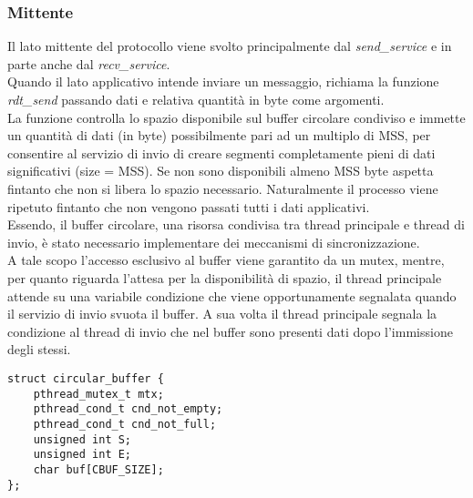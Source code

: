 \subsubsection{Mittente}
%
Il lato mittente del protocollo viene svolto principalmente dal 
\emph{send\_service} e in parte anche dal \emph{recv\_service}.\\
Quando il lato applicativo intende inviare un messaggio, richiama la funzione
\emph{rdt\_send} passando dati e relativa quantità in byte come argomenti.\\
La funzione controlla lo spazio disponibile sul buffer circolare condiviso
e immette un quantità di dati (in byte) possibilmente pari ad un multiplo di 
MSS, per consentire al servizio di invio di creare segmenti completamente pieni 
di dati significativi (size = MSS). Se non sono disponibili almeno MSS byte 
aspetta fintanto che non si libera lo spazio necessario. Naturalmente il 
processo viene ripetuto fintanto che non vengono passati tutti i dati 
applicativi.\\
Essendo, il buffer circolare, una risorsa condivisa tra thread principale e 
thread di invio, è stato necessario implementare dei meccanismi di 
sincronizzazione.\\
A tale scopo l'accesso esclusivo al buffer viene garantito da un mutex,
mentre, per quanto riguarda l'attesa per la disponibilità di spazio, il thread
principale attende su una variabile condizione che viene opportunamente segnalata
quando il servizio di invio svuota il buffer. A sua volta il thread principale
segnala la condizione al thread di invio che nel buffer sono presenti dati dopo
l'immissione degli stessi.
%
\begin{lstlisting}[title=trasport.h]
struct circular_buffer {
    pthread_mutex_t mtx;
    pthread_cond_t cnd_not_empty;
    pthread_cond_t cnd_not_full;
    unsigned int S;
    unsigned int E;
    char buf[CBUF_SIZE];
};
\end{lstlisting}

